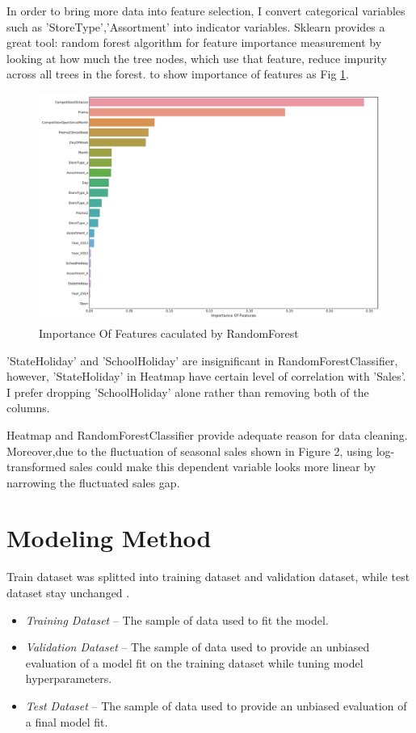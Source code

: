 \documentclass[11pt, a4paper, leqno]{article}
\begin{document}
In order to bring more data into feature selection, I convert categorical variables such as 'StoreType','Assortment' into indicator variables. Sklearn provides a great tool: random forest algorithm for feature importance measurement \cite{liaw2002classification} by looking at how much the tree nodes, which use that feature, reduce impurity across all trees in the forest. to show importance of features as Fig \ref{fig:Importance Of Features}.
\begin{figure}[ht]
\centering
\includegraphics[width=0.9\columnwidth]{formulas/importance_of_features.pdf}
\caption{Importance Of Features caculated by RandomForest}
\label{fig:Importance Of Features}
\end{figure}

'StateHoliday' and 'SchoolHoliday' are insignificant in RandomForestClassifier, however, 'StateHoliday' in Heatmap have certain level of correlation with 'Sales'. I prefer dropping 'SchoolHoliday' alone rather than removing both of the columns.

Heatmap and RandomForestClassifier provide adequate reason for data cleaning. Moreover,due to the fluctuation of seasonal sales shown in Figure 2, using log-transformed sales could make this dependent variable looks more linear by narrowing the fluctuated sales gap.

\section{Modeling Method}
Train dataset was splitted into training dataset and validation dataset, while test dataset stay unchanged \cite{shah2017train}.

\begin{itemize}
    \item \textit{Training Dataset} -- The sample of data used to fit the model.
    \item \textit{Validation Dataset} -- The sample of data used to provide an unbiased evaluation of a model fit on the training dataset while tuning model hyperparameters.
    \item \textit{Test Dataset} -- The sample of data used to provide an unbiased evaluation of a final model fit.
\end{itemize}
\end{document}
